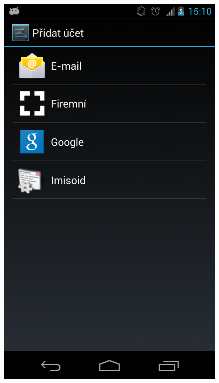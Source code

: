 \documentclass{bakalarka}
\begin{document}
\begin{figure}[H]
  \centering
  \includegraphics[scale=0.3]{scr/ucet.png}
  \label{}
\end{figure}
\end{document}
